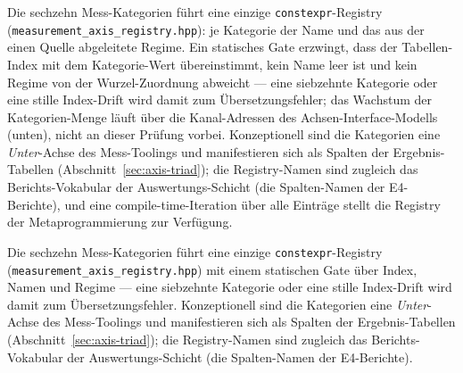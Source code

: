 \begin{nurlang}
Die sechzehn Mess-Kategorien führt eine einzige \texttt{constexpr}-Registry
(\texttt{measurement\_\allowbreak{}axis\_\allowbreak{}registry.hpp}): je Kategorie der Name und das aus der einen Quelle
abgeleitete Regime. Ein statisches Gate erzwingt, dass der Tabellen-Index mit dem Kategorie-Wert
übereinstimmt, kein Name leer ist und kein Regime von der Wurzel-Zuordnung abweicht --- eine
siebzehnte Kategorie oder eine stille Index-Drift wird damit zum Übersetzungsfehler; das Wachstum der
Kategorien-Menge läuft über die Kanal-Adressen des Achsen-Interface-Modells (unten), nicht an dieser
Prüfung vorbei. Konzeptionell sind die Kategorien eine \emph{Unter}-Achse des Mess-Toolings und
manifestieren sich als Spalten der Ergebnis-Tabellen (Abschnitt~\ref{sec:axis-triad}); die
Registry-Namen sind zugleich das Berichts-Vokabular der Auswertungs-Schicht (die Spalten-Namen der
E4-Berichte), und eine compile-time-Iteration über alle Einträge stellt die Registry der
Metaprogrammierung zur Verfügung.
\end{nurlang}
\begin{nurkurz}
Die sechzehn Mess-Kategorien führt eine einzige \texttt{constexpr}-Registry
(\texttt{measurement\_\allowbreak{}axis\_\allowbreak{}registry.hpp}) mit einem statischen Gate über Index,
Namen und Regime --- eine siebzehnte Kategorie oder eine stille Index-Drift wird damit zum
Übersetzungsfehler. Konzeptionell sind die Kategorien eine \emph{Unter}-Achse des Mess-Toolings und
manifestieren sich als Spalten der Ergebnis-Tabellen (Abschnitt~\ref{sec:axis-triad}); die Registry-Namen
sind zugleich das Berichts-Vokabular der Auswertungs-Schicht (die Spalten-Namen der E4-Berichte).
\end{nurkurz}

